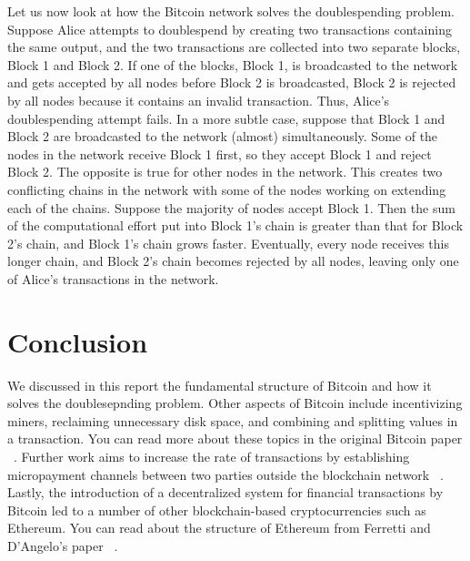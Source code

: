 \documentclass{article}
\begin{document}
Let us now look at how the Bitcoin network solves the doublespending problem. Suppose Alice attempts to doublespend by creating two transactions containing the same output, and the two transactions are collected into two separate blocks, Block 1 and Block 2. If one of the blocks, Block 1, is broadcasted to the network and gets accepted by all nodes before Block 2 is broadcasted, Block 2 is rejected by all nodes because it contains an invalid transaction. Thus, Alice’s doublespending attempt fails. In a more subtle case, suppose that Block 1 and Block 2 are broadcasted to the network (almost) simultaneously. Some of the nodes in the network receive Block 1 first, so they accept Block 1 and reject Block 2. The opposite is true for other nodes in the network. This creates two conflicting chains in the network with some of the nodes working on extending each of the chains. Suppose the majority of nodes accept Block 1. Then the sum of the computational effort put into Block 1’s chain is greater than that for Block 2’s chain, and Block 1’s chain grows faster. Eventually, every node receives this longer chain, and Block 2’s chain becomes rejected by all nodes, leaving only one of Alice’s transactions in the network.

\section{Conclusion}
We discussed in this report the fundamental structure of Bitcoin and how it solves the doublesepnding problem. Other aspects of Bitcoin include incentivizing miners, reclaiming unnecessary disk space, and combining and splitting values in a transaction. You can read more about these topics in the original Bitcoin paper ~\citep{Nakamoto08}. Further work aims to increase the rate of transactions  by establishing micropayment channels between two parties outside the blockchain network ~\citep{Decker15}. Lastly, the introduction of a decentralized system for financial transactions by Bitcoin led to a number of other blockchain-based cryptocurrencies such as Ethereum. You can read about the structure of Ethereum from Ferretti and D’Angelo’s paper ~\citep{Ferretti19}. 



\end{document}
